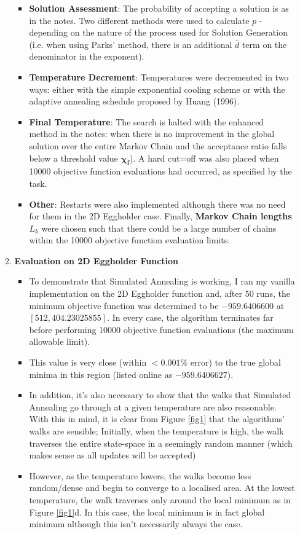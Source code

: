 \documentclass[12pt]{article}
\begin{document}
\begin{enumerate}
\begin{enumerate}
\begin{itemize}
		\item \textbf{Solution Assessment}: The probability of accepting a solution is as in the notes. Two different methods were used to calculate $p$ - depending on the nature of the process used for Solution Generation (i.e. when using Parks' method, there is an additional $\bar{d}$ term on the denominator in the exponent).
		\item \textbf{Temperature Decrement}: Temperatures were decremented in two ways: either with the simple exponential cooling scheme or with the adaptive annealing schedule proposed by Huang (1996).
		\item \textbf{Final Temperature}: The search is halted with the enhanced method in the notes: when there is no improvement in the global solution over the entire Markov Chain and the acceptance ratio falls below a threshold value $\bm{\chi_{f}}$). A hard cut=off was also placed when 10000 objective function evaluations had occurred, as specified by the task. 
		\item \textbf{Other}: Restarts were also implemented although there was no need for them in the 2D Eggholder case. Finally, \textbf{Markov Chain lengths} $L_{k}$ were chosen such that there could be a large number of chains within the 10000 objective function evaluation limits.
	\end{itemize}
	\item \textbf{Evaluation on 2D Eggholder Function}
	\begin{itemize}
		\item To demonstrate that Simulated Annealing is working, I ran my vanilla implementation on the 2D Eggholder function and, after 50 runs, the minimum objective function was determined to be $-959.6406600$ at $[512, 404.23025855]$. In every case, the algorithm terminates far before performing 10000 objective function evaluations (the maximum allowable limit).
		\item This value is very close (within $< 0.001\%$ error) to the true global minima in this region (listed online as $−959.6406627$).
		\item In addition, it's also necessary to show that the walks that Simulated Annealing go through at a given temperature are also reasonable. With this in mind, it is clear from Figure \ref{fig1} that the algorithms' walks are sensible; Initially, when the temperature is high, the walk traverses the entire state-space in a seemingly random manner (which makes sense as all updates will be accepted)
		\item However, as the temperature lowers, the walks become less random/dense and begin to converge to a localised area. At the lowest temperature, the walk traverses only  around the local minimum as in Figure \ref{fig1}d. In this case, the local minimum is in fact global minimum although this isn't necessarily always the case. 

\end{itemize}
\end{enumerate}
\end{enumerate}
\end{document}

